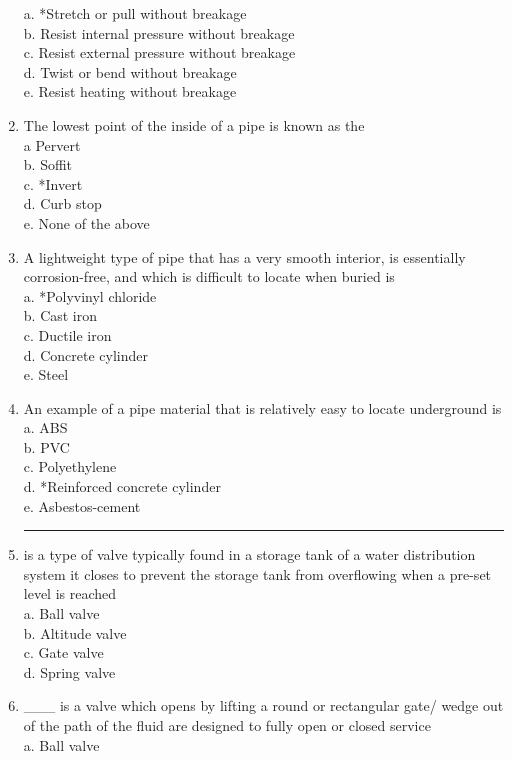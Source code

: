\begin{enumerate}[1.]
a. *Stretch or pull without breakage\\
b. Resist internal pressure without breakage\\
c. Resist external pressure without breakage\\
d. Twist or bend without breakage\\
e. Resist heating without breakage\\
\item The lowest point of the inside of a pipe is known as the\\
a Pervert\\
b. Soffit\\
c. *Invert\\
d. Curb stop\\
e. None of the above\\
\item A lightweight type of pipe that has a very smooth interior, is essentially corrosion-free, and which is difficult to locate when buried is\\
a. *Polyvinyl chloride\\
b. Cast iron\\
c. Ductile iron\\
d. Concrete cylinder\\
e. Steel\\
\item An example of a pipe material that is relatively easy to locate underground is\\
a. ABS\\
b. PVC\\
c. Polyethylene\\
d. *Reinforced concrete cylinder\\
e. Asbestos-cement\\
\item \rule{1.5cm}{0.5pt} is a type of valve typically found in a storage tank of a water distribution system it closes to prevent the storage tank from overflowing when a pre-set level is reached\\
a. Ball valve\\
b. Altitude valve\\
c. Gate valve\\
d. Spring valve\\
\item \_\_\_ is a valve which opens by lifting a round or rectangular gate/ wedge out of the path of the fluid are designed to fully open or closed service\\
a. Ball valve\\

\end{enumerate}

